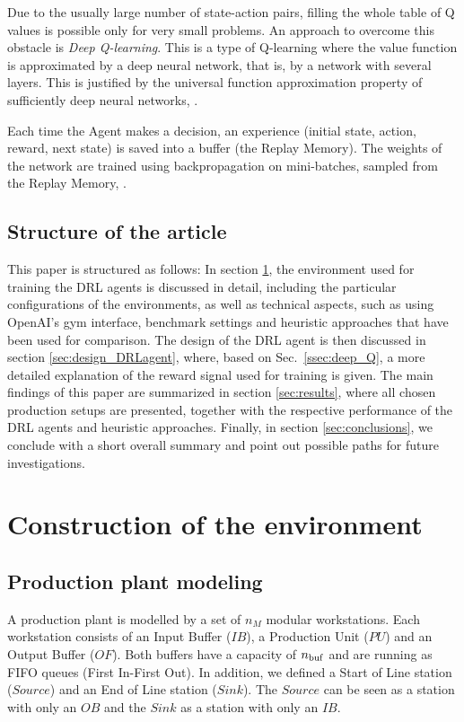 \documentclass[sn-mathphys]{sn-jnl}
\begin{document}
Due to the usually large number of state-action pairs, filling the whole table of Q values is possible only for very small problems. An approach to overcome this obstacle is \emph{Deep Q-learning}. This is a type of Q-learning where the value function is approximated by a deep neural network, that is, by a network with several layers. This is justified by the universal function approximation property of sufficiently deep neural networks, \cite{Hornik1989}.

Each time the Agent makes a decision, an experience (initial state, action, reward, next state) is saved into a buffer (the Replay Memory). The weights of the network are trained using backpropagation on mini-batches, sampled from the Replay Memory, \cite{Sutton2018}. %


\subsection{Structure of the article}
\label{ssec:structure}

This paper is structured as follows: In section \ref{sec:environment}, the environment used for training the DRL agents is discussed in detail, including the particular configurations of the environments, as well as technical aspects, such as using OpenAI's gym interface, benchmark settings and heuristic approaches that have been used for comparison. The design of the DRL agent is then discussed in section \ref{sec:design_DRLagent}, where, based on Sec.~\ref{ssec:deep_Q}, a more detailed explanation of the reward signal used for training is given. The main findings of this paper are summarized in section \ref{sec:results}, where all chosen production setups are presented, together with the respective performance of the DRL agents and heuristic approaches. Finally, in section \ref{sec:conclusions}, we conclude with a short overall summary and point out possible paths for future investigations.


\section{Construction of the environment}
\label{sec:environment}

\subsection{Production plant modeling}

A production plant is modelled by a set of $n_{M}$ modular workstations. Each workstation consists of an Input Buffer ($IB$), a Production Unit ($PU$) and an Output Buffer ($OF$). Both buffers have a capacity of $n_{\rm buf}$ and are running as FIFO queues (First In-First Out). In addition, we defined a Start of Line station ($Source$) and an End of Line station ($Sink$). The $Source$ can be seen as a station with only an $OB$ and the $Sink$ as a station with only an $IB$.
\end{document}

